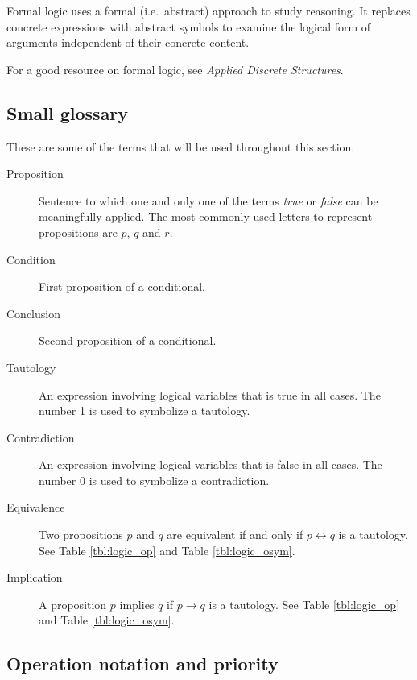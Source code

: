 \documentclass{article}
\begin{document}
Formal logic uses a formal (i.e.~abstract) approach to study reasoning. It
replaces concrete expressions with abstract symbols to examine the logical form
of arguments independent of their concrete content.

For a good resource on formal logic, see \textit{Applied Discrete
  Structures}\cite{ads}.

\subsection{Small glossary}

These are some of the terms that will be used throughout this section.

\begin{description}
  \item[Proposition] Sentence to which one and only one of the terms
    \textit{true} or \textit{false} can be meaningfully applied. The most
    commonly used letters to represent propositions are $p$, $q$ and $r$.
  \item[Condition] First proposition of a conditional.
  \item[Conclusion] Second proposition of a conditional.
  \item[Tautology] An expression involving logical variables that is true in all
    cases. The number 1 is used to symbolize a tautology.
  \item[Contradiction] An expression involving logical variables that is false
    in all cases. The number 0 is used to symbolize a contradiction.
  \item[Equivalence] Two propositions $p$ and $q$ are equivalent if and only if
    $p \leftrightarrow q$ is a tautology. See Table \ref{tbl:logic_op} and Table
    \ref{tbl:logic_osym}.
  \item[Implication] A proposition $p$ implies $q$ if $p \to q$ is a
    tautology. See Table \ref{tbl:logic_op} and Table \ref{tbl:logic_osym}.
\end{description}

\subsection{Operation notation and priority}
\end{document}
